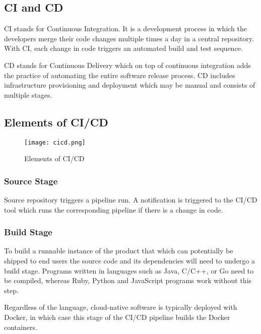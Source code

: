 \subsection{CI and CD}

CI stands for Continuous Integration. It is a development process in which the developers merge
their code changes multiple times a day in a central repository. With CI, each change in code 
triggers an automated build and test sequence.

CD stands for Continuous Delivery which on top of continuous integration adds the practice of 
automating the entire software release process. CD includes infrastructure provisioning and deployment 
which may be manual and consists of multiple stages.~\cite{CICD}

\subsection{Elements of CI/CD}

\begin{figure}[h!]
    \begin{center}
        \texttt{[image: cicd.png]}
    \end{center}
    \caption{Elements of CI/CD}
    \label{fig:cicd}
\end{figure}

\subsubsection{Source Stage}

Source repository triggers a pipeline run. A notification is triggered to the CI/CD tool 
which runs the corresponding pipeline if there is a change in code. 

\subsubsection{Build Stage}

To build a runnable instance of the product that which can potentially be shipped to end users  
the source code and its dependencies will need to undergo a build stage. 
Programs written in languages such as Java, C/C++, or Go need 
to be compiled, whereas Ruby, Python and JavaScript programs work without this step.

Regardless of the language, cloud-native software is typically deployed with Docker, in which case this 
stage of the CI/CD pipeline builds the Docker containers.

